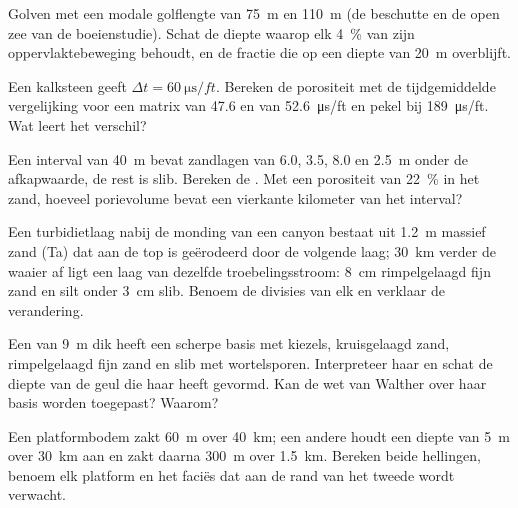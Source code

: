 \begin{exercise}[$\star$]\label{exo:b3:facies-models:4}
Golven met een modale golflengte van \qty{75}{m} en \qty{110}{m} (de beschutte en
de open zee van de boeienstudie). Schat de diepte waarop elk
\qty{4}{\percent} van zijn oppervlaktebeweging behoudt, en de fractie
die op een diepte van \qty{20}{m} overblijft.
\end{exercise}

\begin{exercise}[$\star\star$]\label{exo:b3:facies-models:5}
Een kalksteen geeft $\Delta t = \qty{60}{\micro\second/ft}$. Bereken de
porositeit met de tijdgemiddelde vergelijking voor een matrix van 47.6 en van
\qty{52.6}{\micro\second/ft} en pekel bij \qty{189}{\micro\second/ft}. Wat
leert het verschil?
\end{exercise}

\begin{exercise}[$\star\star$]\label{exo:b3:facies-models:6}
Een interval van \qty{40}{m} bevat zandlagen van 6.0, 3.5, 8.0 en \qty{2.5}{m}
onder de afkapwaarde, de rest is slib. Bereken de . Met
een porositeit van \qty{22}{\percent} in het zand, hoeveel porievolume bevat een
vierkante kilometer van het interval?
\end{exercise}

\begin{exercise}[$\star\star$]\label{exo:b3:facies-models:7}
Een turbidietlaag nabij de monding van een canyon bestaat uit \qty{1.2}{m} massief zand
(Ta) dat aan de top is geërodeerd door de volgende laag; \qty{30}{km} verder de waaier af ligt een laag van
dezelfde troebelingsstroom: \qty{8}{cm} rimpelgelaagd fijn zand en silt onder
\qty{3}{cm} slib. Benoem de divisies van elk en verklaar de verandering.
\end{exercise}

\begin{exercise}[$\star\star$]\label{exo:b3:facies-models:8}
Een  van \qty{9}{m} dik heeft een scherpe basis met
kiezels, kruisgelaagd zand, rimpelgelaagd fijn zand en slib met wortelsporen. Interpreteer
haar en schat de diepte van de geul die haar heeft gevormd. Kan de wet van Walther
over haar basis worden toegepast? Waarom?
\end{exercise}

\begin{exercise}[$\star\star$]\label{exo:b3:facies-models:9}
Een platformbodem zakt \qty{60}{m} over \qty{40}{km}; een andere houdt een
diepte van \qty{5}{m} over \qty{30}{km} aan en zakt daarna \qty{300}{m} over
\qty{1.5}{km}. Bereken beide hellingen, benoem elk platform en het faciës dat
aan de rand van het tweede wordt verwacht.
\end{exercise}

